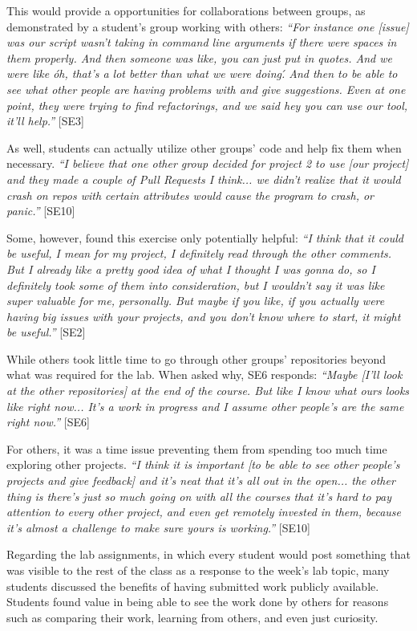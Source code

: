 This would provide a opportunities for collaborations between groups, as demonstrated by a student's group working with others:
\textit{``For instance one [issue] was our script wasn't taking in command line arguments if there were spaces in them properly. And then someone was like, you can just put in quotes. And we were like \'oh, that's a lot better than what we were doing\'. And then to be able to see what other people are having problems with and give suggestions. Even at one point, they were trying to find refactorings, and we said hey you can use our tool, it'll help.''} [SE3]

As well, students can actually utilize other groups' code and help fix them when necessary. \textit{``I believe that one other group decided for project 2 to use [our project] and they made a couple of Pull Requests I think... we didn't realize that it would crash on repos with certain attributes would cause the program to crash, or panic.''} [SE10]

Some, however, found this exercise only potentially helpful:
\textit{``I think that it could be useful, I mean for my project, I definitely read through the other comments. But I already like a pretty good idea of what I thought I was gonna do, so I definitely took some of them into consideration, but I wouldn't say it was like super valuable for me, personally. But maybe if you like, if you actually were having big issues with your projects, and you don't know where to start, it might be useful.''} [SE2]

While others took little time to go through other groups' repositories beyond what was required for the lab. When asked why, SE6 responds: \textit{``Maybe [I'll look at the other repositories] at the end of the course. But like I know what ours looks like right now... It's a work in progress and I assume other people's are the same right now.''} [SE6]

For others, it was a time issue preventing them from spending too much time exploring other projects. \textit{``I think it is important [to be able to see other people's projects and give feedback] and it's neat that it's all out in the open... the other thing is there's just so much going on with all the courses that it's hard to pay attention to every other project, and even get remotely invested in them, because it's almost a challenge to make sure yours is working.''} [SE10]

Regarding the lab assignments, in which every student would post something that was visible to the rest of the class as a response to the week's lab topic, many students discussed the benefits of having submitted work publicly available. Students found value in being able to see the work done by others for reasons such as comparing their work, learning from others, and even just curiosity.

